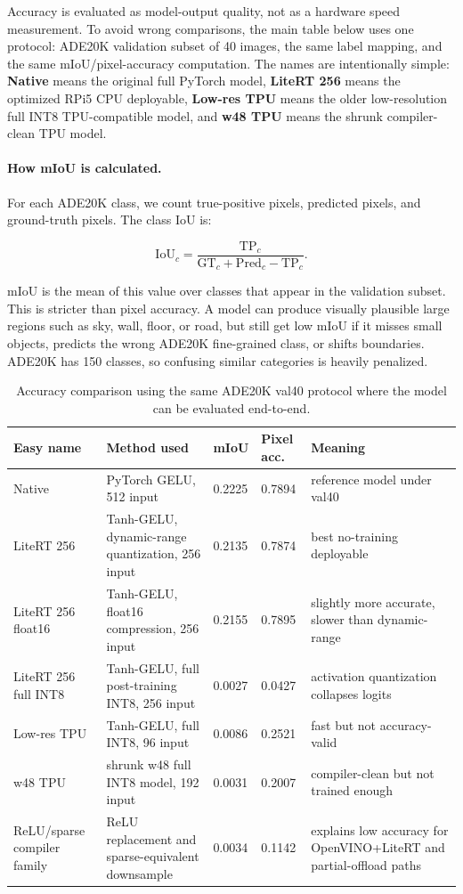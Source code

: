 \documentclass[11pt]{article}
\begin{document}
Accuracy is evaluated as model-output quality, not as a hardware speed measurement. To avoid wrong comparisons, the main table below uses one protocol: ADE20K validation subset of 40 images, the same label mapping, and the same mIoU/pixel-accuracy computation. The names are intentionally simple: \textbf{Native} means the original full PyTorch model, \textbf{LiteRT 256} means the optimized RPi5 CPU deployable, \textbf{Low-res TPU} means the older low-resolution full INT8 TPU-compatible model, and \textbf{w48 TPU} means the shrunk compiler-clean TPU model.

\paragraph{How mIoU is calculated.}
For each ADE20K class, we count true-positive pixels, predicted pixels, and ground-truth pixels. The class IoU is:

\[
\mathrm{IoU}_c = \frac{\mathrm{TP}_c}{\mathrm{GT}_c + \mathrm{Pred}_c - \mathrm{TP}_c}.
\]

mIoU is the mean of this value over classes that appear in the validation subset. This is stricter than pixel accuracy. A model can produce visually plausible large regions such as sky, wall, floor, or road, but still get low mIoU if it misses small objects, predicts the wrong ADE20K fine-grained class, or shifts boundaries. ADE20K has 150 classes, so confusing similar categories is heavily penalized.

\begin{table}[H]
\centering
\caption{Accuracy comparison using the same ADE20K val40 protocol where the model can be evaluated end-to-end.}
\small
\begin{tabularx}{\textwidth}{Y Y Z{0.12\textwidth} Z{0.12\textwidth} Y}
\toprule
Easy name & Method used & mIoU & Pixel acc. & Meaning \\
\midrule
Native & PyTorch GELU, 512 input & 0.2225 & 0.7894 & reference model under val40 \\
LiteRT 256 & Tanh-GELU, dynamic-range quantization, 256 input & 0.2135 & 0.7874 & best no-training deployable \\
LiteRT 256 float16 & Tanh-GELU, float16 compression, 256 input & 0.2155 & 0.7895 & slightly more accurate, slower than dynamic-range \\
LiteRT 256 full INT8 & Tanh-GELU, full post-training INT8, 256 input & 0.0027 & 0.0427 & activation quantization collapses logits \\
Low-res TPU & Tanh-GELU, full INT8, 96 input & 0.0086 & 0.2521 & fast but not accuracy-valid \\
w48 TPU & shrunk w48 full INT8 model, 192 input & 0.0031 & 0.2007 & compiler-clean but not trained enough \\
ReLU/sparse compiler family & ReLU replacement and sparse-equivalent downsample & 0.0034 & 0.1142 & explains low accuracy for OpenVINO+LiteRT and partial-offload paths \\
\bottomrule
\end{tabularx}
\end{table}
\end{document}
